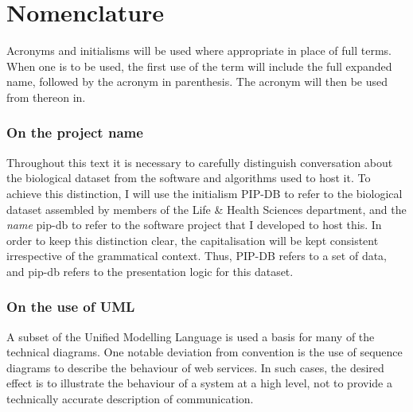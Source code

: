 

\section*{Nomenclature}\label{sec:nomenclature}
Acronyms and initialisms will be used where appropriate in place of
full terms. When one is to be used, the first use of the term will
include the full expanded name, followed by the acronym in
parenthesis. The acronym will then be used from thereon in.


\subsubsection*{On the project name}
Throughout this text it is necessary to carefully distinguish
conversation about the biological dataset from the software and
algorithms used to host it. To achieve this distinction, I will use
the initialism PIP-DB to refer to the biological dataset assembled by
members of the Life \& Health Sciences department, and the
\textit{name} pip-db to refer to the software project that I developed
to host this. In order to keep this distinction clear, the
capitalisation will be kept consistent irrespective of the grammatical
context. Thus, PIP-DB refers to a set of data, and pip-db refers to
the presentation logic for this dataset.


\subsubsection*{On the use of UML}
A subset of the Unified Modelling Language \cite{ibm2003uml} is used a
basis for many of the technical diagrams. One notable deviation from
convention is the use of sequence diagrams \cite{ibm2004sequence} to
describe the behaviour of web services. In such cases, the desired
effect is to illustrate the behaviour of a system at a high level, not
to provide a technically accurate description of communication.


